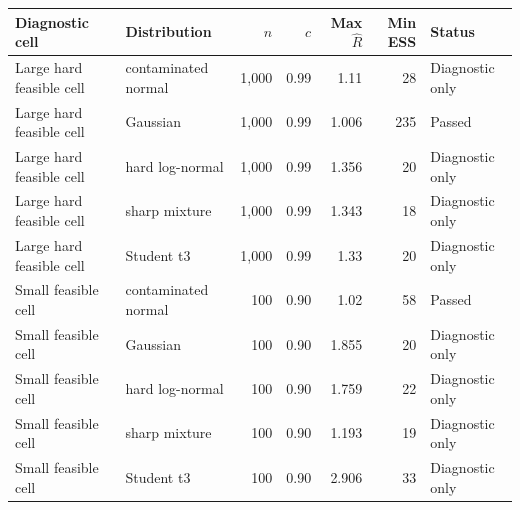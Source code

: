 \begin{tabularx}{\textwidth}{@{}>{\raggedright\arraybackslash}Xlrrrrl@{}}
\toprule
Diagnostic cell & Distribution & \(n\) & \(c\) & Max \(\hat R\) & Min ESS & Status\\
\midrule
Large hard feasible cell & contaminated normal & 1,000 & 0.99 & 1.11 & 28 & Diagnostic only \\
Large hard feasible cell & Gaussian & 1,000 & 0.99 & 1.006 & 235 & Passed \\
Large hard feasible cell & hard log-normal & 1,000 & 0.99 & 1.356 & 20 & Diagnostic only \\
Large hard feasible cell & sharp mixture & 1,000 & 0.99 & 1.343 & 18 & Diagnostic only \\
Large hard feasible cell & Student t3 & 1,000 & 0.99 & 1.33 & 20 & Diagnostic only \\
Small feasible cell & contaminated normal & 100 & 0.90 & 1.02 & 58 & Passed \\
Small feasible cell & Gaussian & 100 & 0.90 & 1.855 & 20 & Diagnostic only \\
Small feasible cell & hard log-normal & 100 & 0.90 & 1.759 & 22 & Diagnostic only \\
Small feasible cell & sharp mixture & 100 & 0.90 & 1.193 & 19 & Diagnostic only \\
Small feasible cell & Student t3 & 100 & 0.90 & 2.906 & 33 & Diagnostic only \\
\bottomrule
\end{tabularx}
